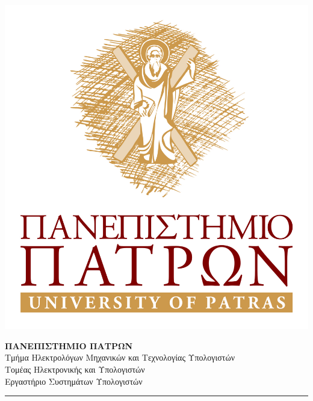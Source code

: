 \begin{titlepage}
 \vspace*{-2cm} 
  \begin{minipage}[c]{.2\linewidth}
  \vspace*{0.55cm} 
    \includegraphics[width=1\linewidth ]{Figures/UPlogo.jpg}
  \end{minipage}\hfill
  \begin{minipage}[c]{.75\linewidth}
  \hfill \break
  \hfill \break

 
  
  \textsc{\Large \textbf{ΠΑΝΕΠΙΣΤΗΜΙΟ ΠΑΤΡΩΝ} }\\
   {\large Τμήμα Ηλεκτρολόγων Μηχανικών και Τεχνολογίας Υπολογιστών\\
   Τομέας Ηλεκτρονικής και Υπολογιστών \\
   Εργαστήριο Συστημάτων Υπολογιστών}
  \end{minipage}
  
\rule{\textwidth}{0.7pt}


\end{titlepage}
